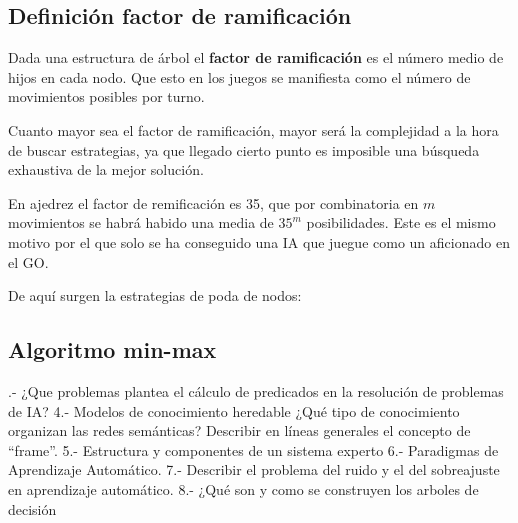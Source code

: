 \documentclass[a4paper]{article}
\begin{document}
\subsection{Definición factor de ramificación}
Dada una estructura de árbol el \textbf{factor de ramificación} es el número medio de hijos en cada nodo. 
Que esto en los juegos se manifiesta como el número de movimientos posibles por turno.  

Cuanto mayor sea el factor de ramificación, mayor será la complejidad a la hora de buscar estrategias, ya que 
llegado cierto punto es imposible una búsqueda exhaustiva de la mejor solución.

En ajedrez el 
factor de remificación es 35, que por combinatoria en $m$ movimientos se habrá habido una media de $35^m$ posibilidades.  
Este es el mismo motivo por el que solo se ha conseguido una IA que juegue como un aficionado en el GO.

De aquí surgen la estrategias de poda de nodos: 

\subsection{Algoritmo min-max}



.- ¿Que problemas plantea el cálculo de predicados en la resolución de problemas de IA?
4.- Modelos de conocimiento heredable ¿Qué tipo de conocimiento organizan las redes semánticas? Describir en líneas generales el concepto de “frame”.
5.-  Estructura y componentes de un sistema experto 
6.- Paradigmas de Aprendizaje Automático.
7.- Describir el problema del ruido y el del sobreajuste en aprendizaje automático.
8.- ¿Qué son y como se construyen los arboles de decisión
\end{document}
